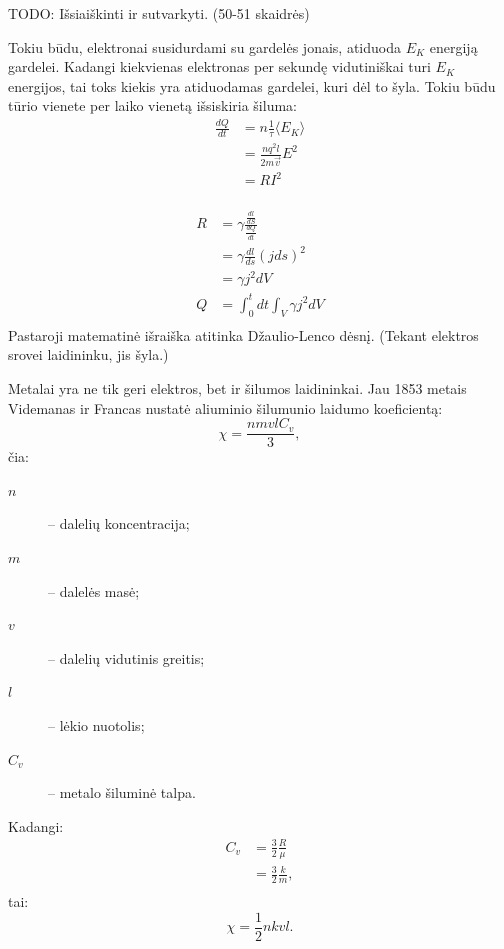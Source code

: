 TODO: Išsiaiškinti ir sutvarkyti. (50-51 skaidrės)

Tokiu būdu, elektronai susidurdami su gardelės jonais, atiduoda
$E_{K}$ energiją gardelei. Kadangi kiekvienas elektronas per sekundę
vidutiniškai turi $E_{K}$ energijos, tai toks kiekis yra atiduodamas
gardelei, kuri dėl to šyla. Tokiu būdu tūrio vienete per laiko
vienetą išsiskiria šiluma:
\begin{align*}
  \frac{dQ}{dt}
  &= n \frac{1}{\tau}\langle E_{K} \rangle \\
  &= \frac{n q^{2} l}{2 m \vec{v}} E^{2} \\
  &= R I^{2} \\
\end{align*}

\begin{align*}
  R
  &= \gamma \frac{\frac{dl}{dS}}{\frac{dQ}{dt}} \\
  &= \gamma \frac{dl}{ds}\left( jds \right)^{2} \\
  &= \gamma j^{2} dV \\
  Q
  &= \int _{0} ^{t} dt \int _{V} \gamma j^{2} dV \\
\end{align*}
Pastaroji matematinė išraiška atitinka Džaulio-Lenco dėsnį.
(Tekant elektros srovei laidininku, jis šyla.)

Metalai yra ne tik geri elektros, bet ir šilumos laidininkai. Jau
1853 metais Videmanas ir Francas nustatė aliuminio šilumunio
laidumo koeficientą:
\begin{equation*}
  \chi = \frac{nmvlC_{v}}{3},
\end{equation*}
čia:
\begin{description}
  \item[$n$] – dalelių koncentracija;
  \item[$m$] – dalelės masė;
  \item[$v$] – dalelių vidutinis greitis;
  \item[$l$] – lėkio nuotolis;
  \item[$C_{v}$] – metalo šiluminė talpa.
\end{description}
Kadangi:
\begin{align*}
  C_{v}
  &= \frac{3}{2}\frac{R}{\mu} \\
  &= \frac{3}{2}\frac{k}{m}, \\
\end{align*}
tai:
\begin{equation*}
  \chi = \frac{1}{2} nkvl.
\end{equation*}

